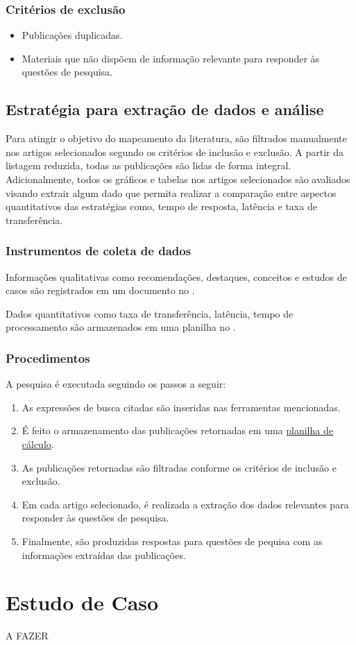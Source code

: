 \subsubsection{Critérios de exclusão}
\label{section:criterios_exclusao}
\begin{itemize}
    \item Publicações duplicadas.
    \item Materiais que não dispõem de informação relevante para responder às questões de pesquisa.
\end{itemize}

\subsection{Estratégia para extração de dados e análise}
Para atingir o objetivo do mapeamento da literatura, são filtrados manualmente nos artigos selecionados segundo os critérios de inclusão e exclusão. A partir da listagem reduzida, todas as publicações são lidas de forma integral.
Adicionalmente, todos os gráficos e tabelas nos artigos selecionados são avaliados visando extrair algum dado que permita realizar a comparação entre aspectos quantitativos das estratégias como, tempo de resposta, latência e taxa de transferência.

\subsubsection{Instrumentos de coleta de dados}
Informações qualitativas como recomendações, destaques, conceitos e estudos de casos são registrados em um documento no . 

Dados quantitativos como taxa de transferência, latência, tempo de processamento são armazenados em uma planilha no . 

\subsubsection{Procedimentos}
A pesquisa é executada seguindo os passos a seguir:
\begin{enumerate}
    \item As expressões de busca citadas são inseridas nas ferramentas mencionadas.
    \item É feito o armazenamento das publicações retornadas em uma \href{https://docs.google.com/spreadsheets/d/1rtH8Jl1EHguqZ4Py2mgV3pab7IQzt72-Sv2S1jPzLsQ/edit?usp=sharing}{planilha de cálculo}.
    \item As publicações retornadas são filtradas conforme os critérios de inclusão e exclusão.
    \item Em cada artigo selecionado, é realizada a extração dos dados relevantes para responder às questões de pesquisa.
    \item Finalmente, são produzidas respostas para questões de pequisa com as informações extraídas das publicações.
\end{enumerate}

\section{Estudo de Caso}
A FAZER
